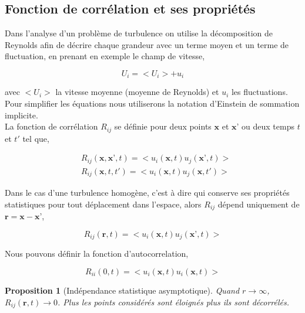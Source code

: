 \documentclass[12pt]{article}
\theoremstyle{plain}
\newtheorem{proposition}[theorem]{Proposition}
\theoremstyle{remark}
\begin{document}
	\subsection{Fonction de corrélation et ses propriétés}
		
		Dans l'analyse d'un problème de turbulence on utilise la décomposition de Reynolds afin de décrire chaque grandeur avec un terme moyen et un terme de fluctuation, en prenant en exemple le champ de vitesse, 
		
		\begin{equation}
			U_i=<U_i> + u_i 	
		\end{equation}
	
		avec $<U_i>$ la vitesse moyenne (moyenne de Reynolds) et $u_i$ les fluctuations. \\
		Pour simplifier les équations nous utiliserons la notation d'Einstein de sommation implicite. \\
		La fonction de corrélation $R_{ij}$ se définie pour deux points $\textbf{x}$ et $\textbf{x'}$ ou deux temps $t$ et $t'$ tel que,
		
		\begin{equation}
		\begin{split}
			&R_{ij}(\textbf{x},\textbf{x'},t) = <u_i(\textbf{x},t) u_j(\textbf{x'},t)> \\
			&R_{ij}(\textbf{x},t,t') = <u_i(\textbf{x},t) u_j(\textbf{x},t')>
		\end{split}
		\end{equation}
	
		Dans le cas d'une turbulence homogène, c'est à dire qui conserve ses propriétés statistiques pour tout déplacement dans l'espace, alors $R_{ij}$ dépend uniquement de $\textbf{r}=\textbf{x}-\textbf{x'}$,
		
		\begin{equation}
			R_{ij}(\textbf{r},t) = <u_i(\textbf{x},t) u_j(\textbf{x'},t)>
			\label{eq:correlation}
		\end{equation}
	
		Nous pouvons définir la fonction d'autocorrelation,
		
		\begin{equation}
			R_{ii}(0,t) = <u_i(\textbf{x},t) u_i(\textbf{x},t)>
		\end{equation}
	
		\begin{proposition}[Indépendance statistique asymptotique]
			Quand $r\rightarrow\infty$, $R_{ij}(\textbf{r},t)\rightarrow0$. Plus les points considérés sont éloignés plus ils sont décorrélés.
		\end{proposition}
	
\end{document}

